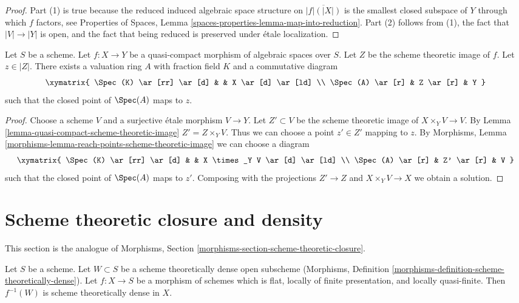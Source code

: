 \begin{proof}
Part (1) is true because the reduced induced algebraic space structure on
$\overline{|f|(|X|)}$ is the smallest closed subspace
of $Y$ through which $f$ factors, see
Properties of Spaces, Lemma \ref{spaces-properties-lemma-map-into-reduction}.
Part (2) follows from (1), the fact that $|V| \to |Y|$ is open, and the
fact that being reduced is preserved under \'etale localization.
\end{proof}

\begin{lemma}
\label{lemma-reach-points-scheme-theoretic-image}
Let $S$ be a scheme.
Let $f : X \to Y$ be a quasi-compact morphism of algebraic spaces over $S$.
Let $Z$ be the scheme theoretic image of $f$.
Let $z \in |Z|$. There exists a valuation ring $A$ with
fraction field $K$ and a commutative diagram
$$
\xymatrix{
\Spec(K) \ar[rr] \ar[d] & & X \ar[d] \ar[ld] \\
\Spec(A) \ar[r] & Z \ar[r] & Y
}
$$
such that the closed point of $\Spec(A)$ maps to $z$.
\end{lemma}

\begin{proof}
Choose a scheme $V$ and a surjective \'etale morphism $V \to Y$.
Let $Z' \subset V$ be the scheme theoretic image of $X \times_Y V \to V$.
By Lemma \ref{lemma-quasi-compact-scheme-theoretic-image}
$Z' = Z \times_Y V$. Thus we can choose a point $z' \in Z'$ mapping to $z$.
By Morphisms, Lemma \ref{morphisms-lemma-reach-points-scheme-theoretic-image}
we can choose a diagram
$$
\xymatrix{
\Spec(K) \ar[rr] \ar[d] & & X \times_Y V \ar[d] \ar[ld] \\
\Spec(A) \ar[r] & Z' \ar[r] & V
}
$$
such that the closed point of $\Spec(A)$ maps to $z'$.
Composing with the projections $Z' \to Z$ and $X \times_Y V \to X$
we obtain a solution.
\end{proof}








\section{Scheme theoretic closure and density}
\label{section-scheme-theoretic-closure}

\noindent
This section is the analogue of
Morphisms, Section \ref{morphisms-section-scheme-theoretic-closure}.

\begin{lemma}
\label{lemma-scheme-theoretically-dense-representable}
Let $S$ be a scheme. Let $W \subset S$ be a scheme theoretically
dense open subscheme
(Morphisms, Definition \ref{morphisms-definition-scheme-theoretically-dense}).
Let $f : X \to S$ be a morphism of schemes which is flat, locally of
finite presentation, and locally quasi-finite.
Then $f^{-1}(W)$ is scheme theoretically dense in $X$.
\end{lemma}

